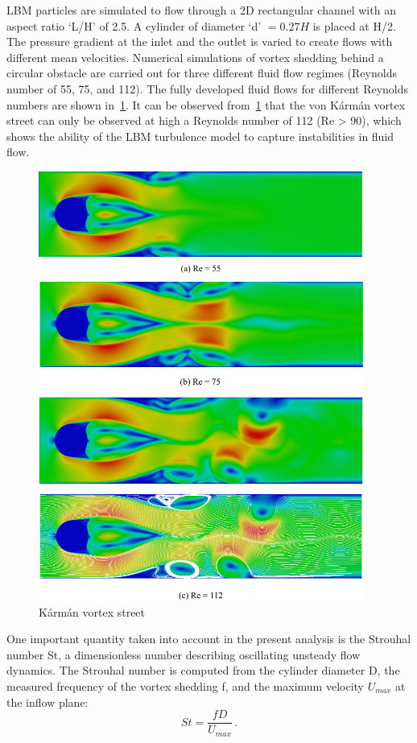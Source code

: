 LBM particles are simulated to flow through a 2D rectangular channel with an 
aspect ratio `L/H' of 2.5. A cylinder of diameter `d' $=0.27H$ is placed at 
H/2. The pressure gradient at the inlet and the outlet is varied to create 
flows with different mean velocities. Numerical simulations of vortex 
shedding behind a circular obstacle are carried out for three different fluid 
flow regimes (Reynolds number of 55, 75, and 112). The fully developed fluid 
flows for different Reynolds numbers are shown in~\cref{fig:karman}. It can be 
observed from~\cref{fig:karman} that the von K\'{a}rm\'{a}n vortex street can 
only be observed at high a Reynolds number of 112 (Re > 90), which shows the 
ability of the LBM turbulence model to capture instabilities in fluid flow.
%
\begin{figure}[htbp]
	\centering
	\includegraphics[width=0.95\textwidth]{karman}
	\caption{K\'{a}rm\'{a}n vortex street}
	\label{fig:karman}
\end{figure}

One important quantity taken into account in the present analysis is the 
Strouhal number St, a dimensionless number describing oscillating unsteady 
flow dynamics. The Strouhal number is computed from the cylinder diameter D, 
the measured frequency of the vortex shedding f, and the maximum velocity 
$U_{max}$ at the inflow plane:
%
\begin{equation}
St=\frac{fD}{U_{max}}\,.
\end{equation}

